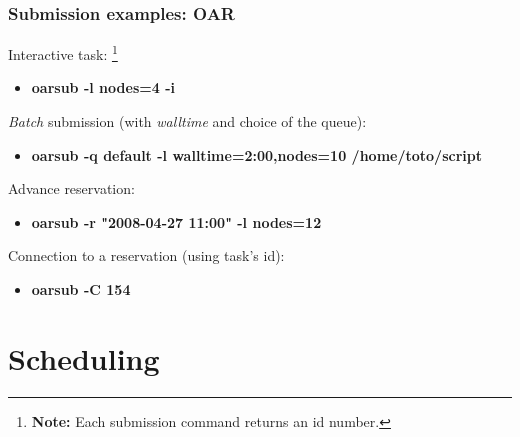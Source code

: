 \documentclass{beamer}
\begin{document}

\begin{frame}
	\frametitle{Submission examples: OAR}
	
Interactive task: \footnote{{\bf Note:} Each submission command returns an id number.}

		\begin{itemize}
			\item	{\bf oarsub -l nodes=4 -i}
		\end{itemize}

	{\em Batch} submission (with {\em walltime} and choice of the queue):
		\begin{itemize}
			\item	{\bf oarsub -q default -l walltime=2:00,nodes=10 /home/toto/script}
		\end{itemize}

	Advance reservation:
		\begin{itemize}
			\item	{\bf oarsub -r "2008-04-27 11:00" -l nodes=12}
		\end{itemize}

	Connection to a reservation (using task's id):
		\begin{itemize}
			\item	{\bf oarsub -C 154}
		\end{itemize}


\end{frame}

\section{Scheduling}

\end{document}

